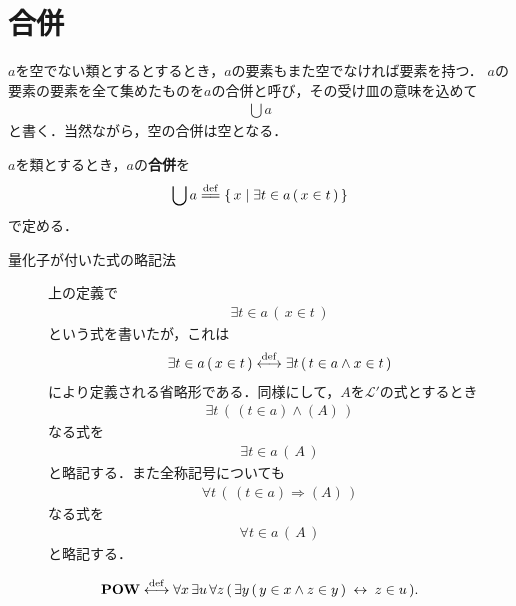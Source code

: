 \section{合併}
	$a$を空でない類とするとするとき，$a$の要素もまた空でなければ要素を持つ．
	$a$の要素の要素を全て集めたものを$a$の合併と呼び，その受け皿の意味を込めて
	\begin{align}
		\bigcup a
	\end{align}
	と書く．当然ながら，空の合併は空となる．
	
	\begin{screen}
		\begin{dfn}[合併]
			$a$を類とするとき，$a$の{\bf 合併}を
			\begin{align}
				\bigcup a \defeq \Set{x}{\exists t \in a\, (\, x \in t\, )}
				\label{eq:definition_of_union_1}
			\end{align}
			で定める．
		\end{dfn}
	\end{screen}
	
	\begin{description}
		\item[量化子が付いた式の略記法]
		上の定義で
		\begin{align}
			\exists t \in a\, (\, x \in t\, )
		\end{align}
		という式を書いたが，これは
		\begin{align}
			\exists t \in a\, (\, x \in t\, ) \overset{\mathrm{def}}{\longleftrightarrow} \exists t\, (\, t \in a \wedge x \in t\, )
		\end{align}
		により定義される省略形である．同様にして，$A$を$\mathcal{L}'$の式とするとき
		\begin{align}
			\exists t\, \left(\, (t \in a) \wedge (A)\, \right)
		\end{align}
		なる式を
		\begin{align}
			\exists t \in a\, (\, A\, )
		\end{align}
		と略記する．また全称記号についても
		\begin{align}
			\forall t\, \left(\, (t \in a) \Longrightarrow (A)\, \right)
		\end{align}
		なる式を
		\begin{align}
			\forall t \in a\, (\, A\, )
		\end{align}
		と略記する．
	\end{description}
	
	\begin{screen}
		\begin{axm}[合併の公理]
			\begin{align}
				\mbox{{\bf POW}} \overset{\mathrm{def}}{\longleftrightarrow}
				\forall x\, \exists u\, \forall z\, (\, \exists y\, (\, y \in x \wedge z \in y\, ) \hspace{0.25em}\leftrightarrow\hspace{0.25em} z \in u\, ).
			\end{align}
		\end{axm}
	\end{screen}
	
